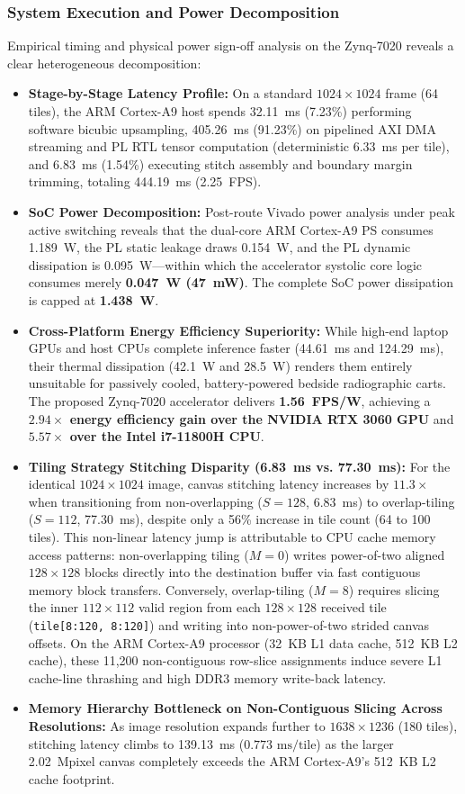 \documentclass[conference]{IEEEtran}
\begin{document}
\subsubsection{System Execution and Power Decomposition}
Empirical timing and physical power sign-off analysis on the Zynq-7020 reveals a clear heterogeneous decomposition:
\begin{itemize}
    \item \textbf{Stage-by-Stage Latency Profile:} On a standard $1024 \times 1024$ frame (64 tiles), the ARM Cortex-A9 host spends 32.11~ms (7.23\%) performing software bicubic upsampling, 405.26~ms (91.23\%) on pipelined AXI DMA streaming and PL RTL tensor computation (deterministic 6.33~ms per tile), and 6.83~ms (1.54\%) executing stitch assembly and boundary margin trimming, totaling 444.19~ms (2.25~FPS).
    \item \textbf{SoC Power Decomposition:} Post-route Vivado power analysis under peak active switching reveals that the dual-core ARM Cortex-A9 PS consumes 1.189~W, the PL static leakage draws 0.154~W, and the PL dynamic dissipation is 0.095~W---within which the accelerator systolic core logic consumes merely \textbf{0.047~W (47~mW)}. The complete SoC power dissipation is capped at \textbf{1.438~W}.
    \item \textbf{Cross-Platform Energy Efficiency Superiority:} While high-end laptop GPUs and host CPUs complete inference faster (44.61~ms and 124.29~ms), their thermal dissipation (42.1~W and 28.5~W) renders them entirely unsuitable for passively cooled, battery-powered bedside radiographic carts. The proposed Zynq-7020 accelerator delivers \textbf{1.56~FPS/W}, achieving a \textbf{$2.94\times$ energy efficiency gain over the NVIDIA RTX 3060 GPU} and \textbf{$5.57\times$ over the Intel i7-11800H CPU}.
    \item \textbf{Tiling Strategy Stitching Disparity (6.83~ms vs. 77.30~ms):} For the identical $1024 \times 1024$ image, canvas stitching latency increases by $11.3\times$ when transitioning from non-overlapping ($S=128$, 6.83~ms) to overlap-tiling ($S=112$, 77.30~ms), despite only a 56\% increase in tile count (64 to 100 tiles). This non-linear latency jump is attributable to CPU cache memory access patterns: non-overlapping tiling ($M=0$) writes power-of-two aligned $128 \times 128$ blocks directly into the destination buffer via fast contiguous memory block transfers. Conversely, overlap-tiling ($M=8$) requires slicing the inner $112 \times 112$ valid region from each $128 \times 128$ received tile (\texttt{tile[8:120, 8:120]}) and writing into non-power-of-two strided canvas offsets. On the ARM Cortex-A9 processor (32~KB L1 data cache, 512~KB L2 cache), these 11,200 non-contiguous row-slice assignments induce severe L1 cache-line thrashing and high DDR3 memory write-back latency.
    \item \textbf{Memory Hierarchy Bottleneck on Non-Contiguous Slicing Across Resolutions:} As image resolution expands further to $1638 \times 1236$ (180 tiles), stitching latency climbs to 139.13~ms ($0.773\text{ ms/tile}$) as the larger 2.02~Mpixel canvas completely exceeds the ARM Cortex-A9's 512~KB L2 cache footprint.
\end{itemize}
\end{document}
